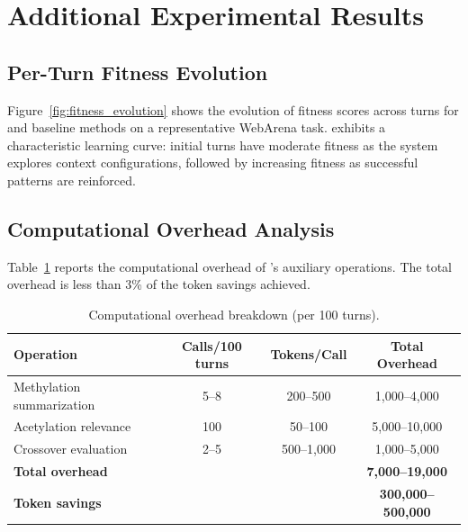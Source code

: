 \section{Additional Experimental Results}

\subsection{Per-Turn Fitness Evolution}

Figure~\ref{fig:fitness_evolution} shows the evolution of fitness scores across turns for \EpiContext{} and baseline methods on a representative WebArena task. \EpiContext{} exhibits a characteristic learning curve: initial turns have moderate fitness as the system explores context configurations, followed by increasing fitness as successful patterns are reinforced.


\subsection{Computational Overhead Analysis}

Table~\ref{tab:overhead} reports the computational overhead of \EpiContext's auxiliary operations. The total overhead is less than 3\% of the token savings achieved.

\begin{table}[h]
\centering
\caption{Computational overhead breakdown (per 100 turns).}
\label{tab:overhead}
\begin{tabular}{lccc}
\toprule
\textbf{Operation} & \textbf{Calls/100 turns} & \textbf{Tokens/Call} & \textbf{Total Overhead} \\
\midrule
Methylation summarization & 5--8 & 200--500 & 1,000--4,000 \\
Acetylation relevance & 100 & 50--100 & 5,000--10,000 \\
Crossover evaluation & 2--5 & 500--1,000 & 1,000--5,000 \\
\midrule
\textbf{Total overhead} & & & \textbf{7,000--19,000} \\
\textbf{Token savings} & & & \textbf{300,000--500,000} \\
\bottomrule
\end{tabular}
\end{table}

